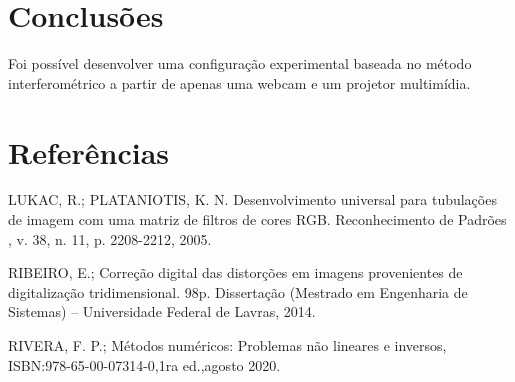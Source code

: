 \documentclass[a4paper, 12pt]{article}
\begin{document}
\section{Conclusões}


Foi possível desenvolver uma configuração experimental baseada no método interferométrico a partir de apenas uma webcam e um projetor multimídia. 


\section*{Referências}

LUKAC, R.; PLATANIOTIS, K. N. Desenvolvimento universal para tubulações de imagem com uma matriz de filtros de cores RGB. Reconhecimento de Padrões , v. 38, n. 11, p. 2208-2212, 2005.
\vspace{.5cm}

RIBEIRO, E.; Correção digital das distorções em imagens provenientes de digitalização tridimensional. 98p. Dissertação (Mestrado em Engenharia de Sistemas) – Universidade Federal de Lavras, 2014. 
\vspace{.5cm}

RIVERA, F. P.; Métodos numéricos: Problemas não lineares e inversos, ISBN:978-65-00-07314-0,1ra ed.,agosto 2020.
\vspace{.5cm}
\end{document}
